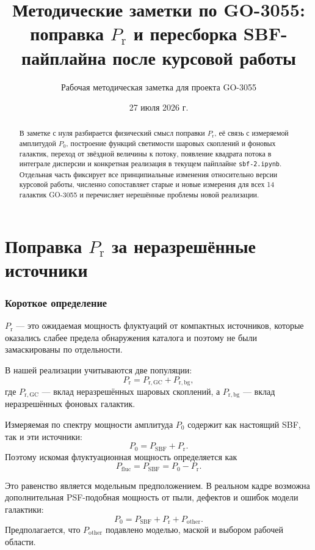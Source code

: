 \documentclass[12pt,a4paper]{article}
\title{Методические заметки по GO-3055:
поправка \texorpdfstring{$P_{\mathrm r}$}{Pr} и пересборка
SBF-пайплайна после курсовой работы}
\author{Рабочая методическая заметка для проекта GO-3055}
\date{27 июля 2026 г.}
\newcommand{\Prpow}{P_{\mathrm r}}
\newcommand{\Psbf}{P_{\mathrm{SBF}}}
\newcommand{\Pfluc}{P_{\mathrm{fluc}}}
\begin{document}
\maketitle

\begin{abstract}
В заметке с нуля разбирается физический смысл поправки
\(\Prpow\), её связь с измеряемой амплитудой \(P_0\), построение
функций светимости шаровых скоплений и фоновых галактик,
переход от звёздной величины к потоку, появление квадрата
потока в интеграле дисперсии и конкретная реализация в
текущем пайплайне \texttt{sbf-2.ipynb}. Отдельная часть
фиксирует все принципиальные изменения относительно версии
курсовой работы, численно сопоставляет старые и новые
измерения для всех 14 галактик GO-3055 и перечисляет
нерешённые проблемы новой реализации.
\end{abstract}

\tableofcontents

\part{Поправка \(P_{\mathrm r}\) за неразрешённые источники}

\section{Короткое определение}

\(\Prpow\) --- это ожидаемая мощность флуктуаций от компактных
источников, которые оказались слабее предела обнаружения
каталога и поэтому не были замаскированы по отдельности.

В нашей реализации учитываются две популяции:
\begin{equation}
    \Prpow = P_{\mathrm{r,GC}} + P_{\mathrm{r,bg}},
\end{equation}
где \(P_{\mathrm{r,GC}}\) --- вклад неразрешённых шаровых
скоплений, а \(P_{\mathrm{r,bg}}\) --- вклад неразрешённых
фоновых галактик.

Измеряемая по спектру мощности амплитуда \(P_0\) содержит
как настоящий SBF, так и эти источники:
\begin{equation}
    P_0 = \Psbf + \Prpow.
\end{equation}
Поэтому искомая флуктуационная мощность определяется как
\begin{equation}
    \Pfluc = \Psbf = P_0-\Prpow.
\end{equation}

Это равенство является модельным предположением. В реальном
кадре возможна дополнительная PSF-подобная мощность от пыли,
дефектов и ошибок модели галактики:
\begin{equation}
    P_0 =
    \Psbf+\Prpow+P_{\mathrm{other}}.
\end{equation}
Предполагается, что \(P_{\mathrm{other}}\) подавлено моделью,
маской и выбором рабочей области.
\end{document}
